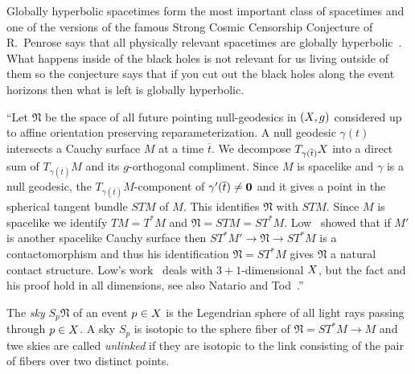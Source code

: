 \documentclass[12pt,reqno,a4paper]{amsart}
\begin{document}
        Globally hyperbolic spacetimes form the most important class of
        spacetimes and one of the versions of the famous Strong Cosmic
        Censorship Conjecture of R.~Penrose says that all physically relevant
        spacetimes are globally hyperbolic~\cite{Penrose}. What happens inside
        of the black holes is not relevant for us living outside of them so
        the conjecture says that if you cut out the black holes along the
        event horizons then what is left is globally hyperbolic.
        \par\hfill\par
        ``Let $\mathfrak N$ be the space of all future pointing null-geodesics
        in $(\ss, g)$ considered up to affine orientation preserving
        reparameterization. A null geodesic $\gamma(t)$ intersects a Cauchy
        surface $M$ at a time $\overline{t}.$
        We decompose $T_{\gamma(\overline{t})}\ss$
        into a direct sum of $T_{\gamma(\overline{t})}M$ and its $g$-orthogonal
        compliment. Since $M$ is spacelike and $\gamma$ is a null geodesic,
        the $T_{\gamma(\overline{t})}M$-component of
        $\gamma'(\overline{t})\neq {\bf 0}$
        and it gives a point in the spherical tangent bundle $STM$ of $M.$
        This identifies $\mathfrak N$ with $STM$. Since $M$ is spacelike we
        identify $TM=T^*M$ and $\mathfrak N=STM=ST^*M.$
        Low~\cite{LowLegendrian} showed that if $M'$ is another spacelike
        Cauchy surface then $ST^*M'\to \mathfrak N\to ST^*M$ is a
        contactomorphism and thus his identification $\mathfrak N=ST^*M$
        gives $\mathfrak N$ a natural contact structure.
        Low's work~\cite{Low0, LowLegendrian} deals with
        $3+1$-dimensional $\ss$, but the fact and his proof hold in all
        dimensions, see also Natario and Tod~\cite[pages 252-253]{NatarioTod}.''
        \par\hfill\par
        The {\em sky} $S_p\mathfrak N$ of an event $p\in \ss$ is the
        Legendrian sphere of all light rays passing through $p\in \ss$.
        A sky $S_p$ is isotopic to the sphere fiber of
        $\mathfrak N=ST^*M\to M$ and twe skies are called
        {\em unlinked \/}if they are isotopic to the link consisting
        of the pair of fibers over two distinct points.
        \par\hfill\par
\end{document}
